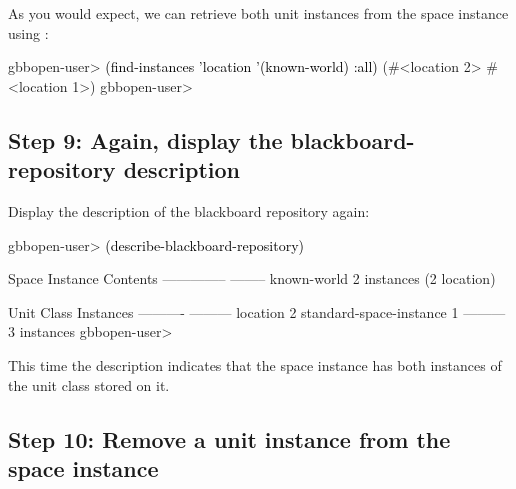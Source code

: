 \documentclass[10pt,twoside,english,pdftex]{article}
\begin{document}
%
%
As you would expect, we can retrieve both  unit
instances from the  space instance using
:
%
\W\supp
\begin{example}
\textcolor{darkergray}{%
  gbbopen-user> \textcolor{black}{(find-instances 'location '(known-world) :all)}
  (#<location 2> #<location 1>)
  gbbopen-user>}
\end{example}

\subsection*{Step 9: Again, display the blackboard-repository description}

%
Display the description of the blackboard repository again:
%
\W\supp
\begin{example}
\textcolor{darkergray}{%
  gbbopen-user> \textcolor{black}{(describe-blackboard-repository)}
  
  Space Instance                Contents
  --------------                --------
  known-world                   2 instances (2 location)

  Unit Class                    Instances
  ----------                    ---------
  location                              2
  standard-space-instance               1
                                ---------
                                        3 instances
  gbbopen-user>}
\end{example}

This time the description indicates that the  space
instance has both instances of the  unit class stored on
it.

\subsection*{Step 10:  Remove a unit instance from the space instance}
\end{document}
